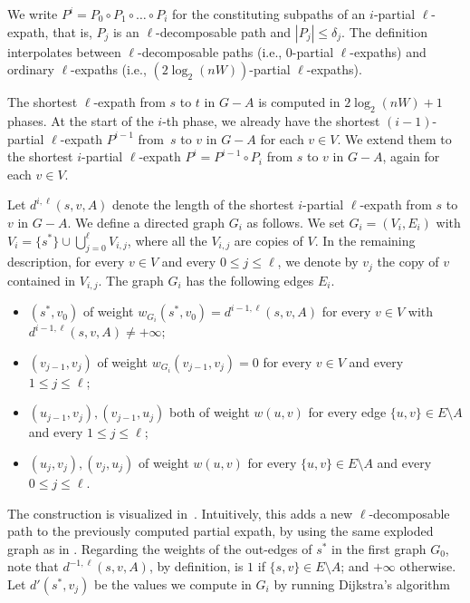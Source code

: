 \documentclass{article}\usepackage[a4paper,margin=20mm]{geometry}
\renewcommand{\leq}{\leqslant}
\renewcommand{\le}{\leqslant}
\begin{document}
We write $P^{i} = P_0 \circ P_1 \circ \ldots \circ P_i$ for the constituting subpaths 
of an $i$-partial $\ell$-expath, that is, $P_j$ is an $\ell$-decomposable path and $|P_j| \le \delta_j$.
The definition interpolates between $\ell$-decomposable paths (i.e., $0$-partial $\ell$-expaths) 
and ordinary $\ell$-expaths (i.e., $(2 \log_2(nW))$-partial $\ell$-expaths).

The shortest $\ell$-expath from $s$ to $t$ in $G - A$ is computed in $2\log_2(nW)+1$ phases.
At the start of the $i$-th phase, we already have the shortest $(i{-}1)$-partial $\ell$-expath 
$P^{i-1}$ from~$s$ to $v$ in $G - A$ for each $v \in V$.
We extend them to the shortest $i$-partial $\ell$-expath 
$P^i = P^{i-1} \circ  P_{i}$ from $s$ to $v$ in $G - A$, again for each $v \in V$. 

Let $d^{i,\ell}(s,v,A)$ denote the length of the shortest $i$-partial $\ell$-expath from $s$ to $v$ in $G{-}A$. We define a directed graph $G_i$ as follows. We set $G_i= (V_i, E_i)$ with $V_i = \{s^*\} \cup \bigcup_{j=0}^{\ell}{V_{i,j}}$, where all the $V_{i,j}$ are copies of $V$.
In the remaining description, for every $v \in V$ and every $0 \leq j \leq \ell$, we denote by $v_{j}$ the copy of $v$ contained in $V_{i,j}$. 
The graph $G_i$ has the following edges $E_i$.
\begin{itemize}
    \item $(s^*,v_{0})$ of weight $w_{G_i}(s^*,v_{0}) = d^{i-1,\ell}(s,v,A)$
    	for every $v \in V$ with $d^{i-1,\ell}(s,v,A) \neq +\infty$;
    \item $(v_{j-1},v_{j})$ of weight $w_{G_i}(v_{j-1},v_{j}) = 0$
    	for every $v \in V$ and every $1 \leq j \leq \ell$;
    \item $(u_{j-1},v_j),(v_{j-1},u_j)$ both of weight $w(u,v)$
    	for every edge $\{u,v\} \in E{\setminus}A$ and every $1 \leq j \leq \ell$;
    \item $(u_{j},v_{j}), (v_j,u_j)$ of weight $w(u,v)$
    	for every \mbox{$\{u,v\} \in E{\setminus}A$} and every $0 \leq j \leq \ell$.
\end{itemize}
The construction is visualized in~. 
Intuitively, this adds a new $\ell$-decomposable path to the previously computed partial expath, by using the same exploded graph as in .
Regarding the weights of the out-edges of $s^*$ in the first graph $G_0$,
note that $d^{-1,\ell}(s,v,A)$, by definition, is $1$ if $\{s,v\} \in E{\setminus}A$;
and $+\infty$ otherwise.
Let $d'(s^*,v_j)$ be the values we compute in $G_i$ by running Dijkstra's algorithm
\end{document}
